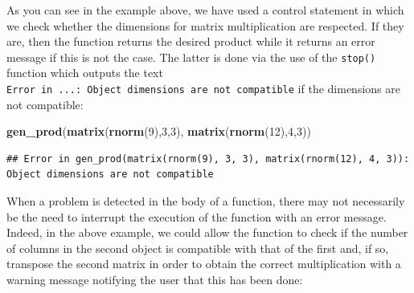 \documentclass[12pt,]{krantz}
\newenvironment{Shaded}{\begin{snugshade}}{\end{snugshade}}
\newcommand{\KeywordTok}[1]{\textcolor[rgb]{0.27,0.27,0.27}{\textbf{#1}}}
\newcommand{\DecValTok}[1]{\textcolor[rgb]{0.06,0.06,0.06}{#1}}
\newcommand{\NormalTok}[1]{#1}
\begin{document}
As you can see in the example above, we have used a control statement in
which we check whether the dimensions for matrix multiplication are
respected. If they are, then the function returns the desired product
while it returns an error message if this is not the case. The latter is
done via the use of the \texttt{stop()} function which outputs the text
\texttt{Error\ in\ ...:\ Object\ dimensions\ are\ not\ compatible} if
the dimensions are not compatible:

\begin{Shaded}
\begin{Highlighting}[]
\KeywordTok{gen_prod}\NormalTok{(}\KeywordTok{matrix}\NormalTok{(}\KeywordTok{rnorm}\NormalTok{(}\DecValTok{9}\NormalTok{),}\DecValTok{3}\NormalTok{,}\DecValTok{3}\NormalTok{), }\KeywordTok{matrix}\NormalTok{(}\KeywordTok{rnorm}\NormalTok{(}\DecValTok{12}\NormalTok{),}\DecValTok{4}\NormalTok{,}\DecValTok{3}\NormalTok{))}
\end{Highlighting}
\end{Shaded}

\begin{verbatim}
## Error in gen_prod(matrix(rnorm(9), 3, 3), matrix(rnorm(12), 4, 3)): Object dimensions are not compatible
\end{verbatim}

When a problem is detected in the body of a function, there may not
necessarily be the need to interrupt the execution of the function with
an error message. Indeed, in the above example, we could allow the
function to check if the number of columns in the second object is
compatible with that of the first and, if so, transpose the second
matrix in order to obtain the correct multiplication with a warning
message notifying the user that this has been done:
\end{document}
